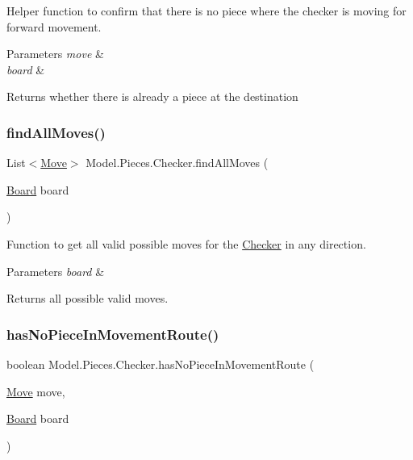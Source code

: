 Helper function to confirm that there is no piece where the checker is moving for forward movement. 
\begin{DoxyParams}{Parameters}
{\em move} & \\
\hline
{\em board} & \\
\hline
\end{DoxyParams}
\begin{DoxyReturn}{Returns}
whether there is already a piece at the destination 
\end{DoxyReturn}
\hypertarget{class_model_1_1_pieces_1_1_checker_a840159766272906e7d72551c92623eee}{}\label{class_model_1_1_pieces_1_1_checker_a840159766272906e7d72551c92623eee} 
\subsubsection{\texorpdfstring{find\+All\+Moves()}{findAllMoves()}}
{\footnotesize\ttfamily List$<$\hyperlink{class_model_1_1_move}{Move}$>$ Model.\+Pieces.\+Checker.\+find\+All\+Moves (\begin{DoxyParamCaption}\item[{\hyperlink{class_model_1_1_board}{Board}}]{board }\end{DoxyParamCaption})}

Function to get all valid possible moves for the \hyperlink{class_model_1_1_pieces_1_1_checker}{Checker} in any direction. 
\begin{DoxyParams}{Parameters}
{\em board} & \\
\hline
\end{DoxyParams}
\begin{DoxyReturn}{Returns}
all possible valid moves. 
\end{DoxyReturn}
\hypertarget{class_model_1_1_pieces_1_1_checker_a493190714612bdc8125c475b41434c75}{}\label{class_model_1_1_pieces_1_1_checker_a493190714612bdc8125c475b41434c75} 
\subsubsection{\texorpdfstring{has\+No\+Piece\+In\+Movement\+Route()}{hasNoPieceInMovementRoute()}}
{\footnotesize\ttfamily boolean Model.\+Pieces.\+Checker.\+has\+No\+Piece\+In\+Movement\+Route (\begin{DoxyParamCaption}\item[{\hyperlink{class_model_1_1_move}{Move}}]{move,  }\item[{\hyperlink{class_model_1_1_board}{Board}}]{board }\end{DoxyParamCaption})}

